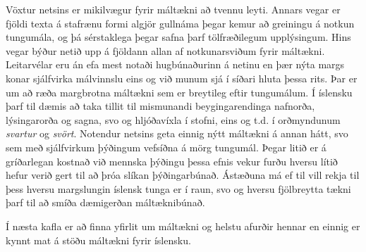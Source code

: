 \documentclass{../../metanetpaper}
\begin{document}
\begin{multicols}{2}
Vöxtur netsins er mikilvægur fyrir máltækni að tvennu leyti. Annars vegar er fjöldi texta á stafrænu formi algjör gullnáma þegar kemur að greiningu á notkun tungumála, og þá sérstaklega þegar safna þarf tölfræðilegum upplýsingum. Hins vegar býður netið upp á fjöldann allan af notkunarsviðum fyrir máltækni.  Leitarvélar eru án efa mest notaði hugbúnaðurinn á netinu en þær nýta margs konar sjálfvirka málvinnslu eins og við munum sjá í síðari hluta þessa rits. Þar er um að ræða margbrotna máltækni sem er breytileg eftir tungumálum. Í íslensku þarf til dæmis að taka tillit til mismunandi beygingarendinga nafnorða, lýsingarorða og sagna, svo og hljóðavíxla í stofni, eins og t.d. í orðmyndunum \textit{svartur} og \textit{svört}. Notendur netsins geta einnig nýtt máltækni á annan hátt, svo sem með sjálfvirkum þýðingum vefsíðna á mörg tungumál. Þegar litið er á gríðarlegan kostnað við mennska þýðingu þessa efnis vekur furðu hversu lítið hefur verið gert til að þróa slíkan þýðingarbúnað. Ástæðuna má ef til vill rekja til þess hversu margslungin íslensk tunga er í raun, svo og hversu fjölbreytta tækni þarf til að smíða dæmigerðan máltæknibúnað. 

Í næsta kafla er að finna yfirlit um máltækni og helstu afurðir hennar en einnig er kynnt mat á stöðu máltækni fyrir íslensku.

\end{multicols}

\clearpage


\end{document}
